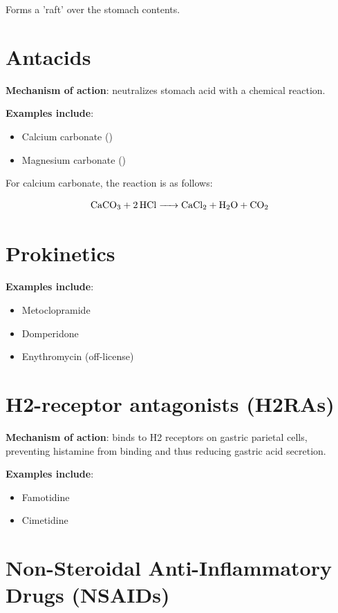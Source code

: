 Forms a 'raft' over the stomach contents.

\section{Antacids}

\textbf{Mechanism of action}: neutralizes stomach acid with a chemical reaction.

\textbf{Examples include}:

\begin{itemize}
    \item Calcium carbonate ()
    \item Magnesium carbonate ()
\end{itemize}

For calcium carbonate, the reaction is as follows:

\begin{equation}
    \ce{CaCO3 + 2HCl -> CaCl2 + H2O + CO2}
\end{equation}

\section{Prokinetics}

\textbf{Examples include}:

\begin{itemize}
    \item Metoclopramide
    \item Domperidone
    \item Enythromycin (off-license)
\end{itemize}

\section{H2-receptor antagonists (H2RAs)}

\textbf{Mechanism of action}: binds to H2 receptors on gastric parietal cells, preventing histamine from binding and thus reducing gastric acid secretion.

\textbf{Examples include}:

\begin{itemize}
    \item Famotidine
    \item Cimetidine
\end{itemize}

\section{Non-Steroidal Anti-Inflammatory Drugs (NSAIDs)}
\label{drugclass:NSAIDs}

